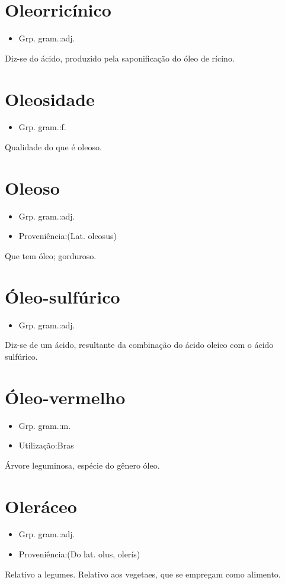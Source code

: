 \section{Oleorricínico}
\begin{itemize}
\item {Grp. gram.:adj.}
\end{itemize}
Diz-se do ácido, produzido pela saponificação do óleo de rícino.
\section{Oleosidade}
\begin{itemize}
\item {Grp. gram.:f.}
\end{itemize}
Qualidade do que é oleoso.
\section{Oleoso}
\begin{itemize}
\item {Grp. gram.:adj.}
\end{itemize}
\begin{itemize}
\item {Proveniência:(Lat. \textunderscore oleosus\textunderscore )}
\end{itemize}
Que tem óleo; gorduroso.
\section{Óleo-sulfúrico}
\begin{itemize}
\item {Grp. gram.:adj.}
\end{itemize}
Diz-se de um ácido, resultante da combinação do ácido oleico com o ácido sulfúrico.
\section{Óleo-vermelho}
\begin{itemize}
\item {Grp. gram.:m.}
\end{itemize}
\begin{itemize}
\item {Utilização:Bras}
\end{itemize}
Árvore leguminosa, espécie do gênero \textunderscore óleo\textunderscore .
\section{Oleráceo}
\begin{itemize}
\item {Grp. gram.:adj.}
\end{itemize}
\begin{itemize}
\item {Proveniência:(Do lat. \textunderscore olus\textunderscore , \textunderscore olerís\textunderscore )}
\end{itemize}
Relativo a legumes.
Relativo aos vegetaes, que se empregam como alimento.
